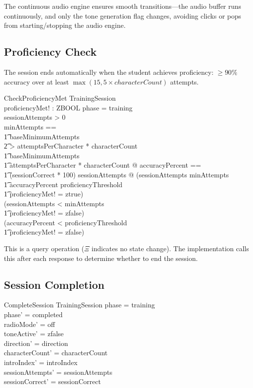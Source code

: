 \documentclass[a4paper,10pt,fleqn]{article}
\begin{document}
The continuous audio engine ensures smooth transitions---the audio buffer runs
continuously, and only the tone generation flag changes, avoiding clicks or pops
from starting/stopping the audio engine.

\subsection{Proficiency Check}

The session ends automatically when the student achieves proficiency:
$\geq 90\%$ accuracy over at least $\max(15, 5 \times characterCount)$ attempts.

\begin{schema}{CheckProficiencyMet}
  \Xi TrainingSession \\
  proficiencyMet! : ZBOOL
  \where
  phase = training \\
  sessionAttempts > 0 \\
  \LET minAttempts == \\
  \t1 \IF baseMinimumAttempts \\
  \t2 > attemptsPerCharacter * characterCount \\
  \t1 \THEN baseMinimumAttempts \\
  \t1 \ELSE attemptsPerCharacter * characterCount @
  \LET accuracyPercent == \\
  \t1 (sessionCorrect * 100) \div sessionAttempts @
  (sessionAttempts \geq minAttempts \\
  \t1 \land accuracyPercent \geq proficiencyThreshold \\
  \t1 \land proficiencyMet! = ztrue) \\
  \lor (sessionAttempts < minAttempts \\
  \t1 \land proficiencyMet! = zfalse) \\
  \lor (accuracyPercent < proficiencyThreshold \\
  \t1 \land proficiencyMet! = zfalse)
\end{schema}

This is a query operation ($\Xi$ indicates no state change). The implementation
calls this after each response to determine whether to end the session.

\subsection{Session Completion}

\begin{schema}{CompleteSession}
\Delta TrainingSession
\where
phase = training \\
phase' = completed \\
radioMode' = off \\
toneActive' = zfalse \\
direction' = direction \\
characterCount' = characterCount \\
introIndex' = introIndex \\
sessionAttempts' = sessionAttempts \\
sessionCorrect' = sessionCorrect
\end{schema}
\end{document}
